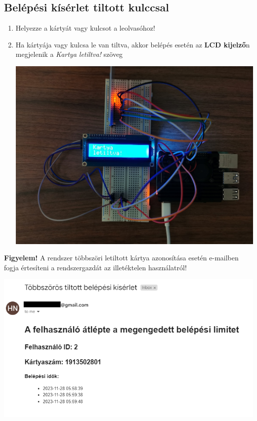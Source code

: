 \documentclass[11pt, a4paper]{article}
\begin{document}
			\subsection{Belépési kísérlet tiltott kulccsal}
				\begin{enumerate}
					\justifying
					\item Helyezze a kártyát vagy kulcsot a leolvasóhoz!
					\item Ha kártyája vagy kulcsa le van tiltva, akkor belépés esetén az \textbf{LCD kijelző}n megjelenik a \emph{Kartya letiltva!} szöveg \\
					\begin{minipage}{\linewidth}
						\centering
						\includegraphics[width=0.7\linewidth]{img/5_letiltott}
						\label{fig:5letiltott}
					\end{minipage}
				\end{enumerate}
				\begin{flushleft}
					{\large\textbf{Figyelem!}} A rendszer többszöri letiltott kártya azonosítása esetén e-mailben fogja értesíteni a rendszergazdát az illetéktelen használatról!\\
					\begin{minipage}{\linewidth}
						\centering
						\begin{framed}
							\includegraphics[width=1.0\linewidth]{img/6_limit_atlepes}
						\end{framed}
						\label{fig:6limitatlepes}
					\end{minipage}
				\end{flushleft}
				\vfill
\end{document}
